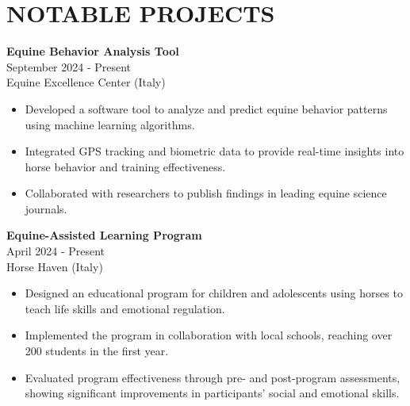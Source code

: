 \documentclass{article}
\begin{document}
\section*{NOTABLE PROJECTS}

\textbf{Equine Behavior Analysis Tool} \\
September 2024 - Present \\
Equine Excellence Center (Italy) \\
\begin{itemize}[leftmargin=*]
    \item Developed a software tool to analyze and predict equine behavior patterns using machine learning algorithms.
    \item Integrated GPS tracking and biometric data to provide real-time insights into horse behavior and training effectiveness.
    \item Collaborated with researchers to publish findings in leading equine science journals.
\end{itemize}

\textbf{Equine-Assisted Learning Program} \\
April 2024 - Present \\
Horse Haven (Italy) \\
\begin{itemize}[leftmargin=*]
    \item Designed an educational program for children and adolescents using horses to teach life skills and emotional regulation.
    \item Implemented the program in collaboration with local schools, reaching over 200 students in the first year.
    \item Evaluated program effectiveness through pre- and post-program assessments, showing significant improvements in participants' social and emotional skills.
\end{itemize}
\end{document}

